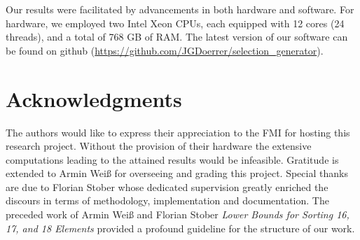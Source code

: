 \documentclass[10pt,journal,compsoc]{IEEEtran}
\begin{document}
Our results were facilitated by advancements in both hardware and software.
For hardware, we employed two Intel Xeon CPUs, each equipped with 12 cores (24 threads), and a total of 768 GB of RAM. %
The latest version of our software can be found on github (\url{https://github.com/JGDoerrer/selection_generator}).



\section*{Acknowledgments}

The authors would like to express their appreciation to the FMI for hosting this research project.
Without the provision of their hardware the extensive computations leading to the attained results would be infeasible.
Gratitude is extended to Armin Weiß for overseeing and grading this project.
Special thanks are due to Florian Stober whose dedicated supervision greatly enriched the discours in terms of methodology, implementation and documentation.
The preceded work of Armin Weiß and Florian Stober \textit{Lower Bounds for Sorting 16, 17, and 18 Elements} \cite{stober2022lower} provided a profound guideline for the structure of our work.

\ifCLASSOPTIONcaptionsoff
  \newpage
\fi




\end{document}
